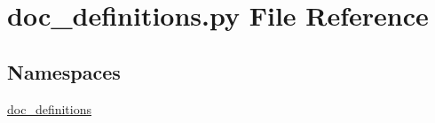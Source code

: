 \section{doc\-\_\-definitions.\-py File Reference}
\label{doc__definitions_8py}
\subsection*{Namespaces}
\begin{DoxyCompactItemize}
\item 
\hyperlink{namespacedoc__definitions}{doc\-\_\-definitions}
\end{DoxyCompactItemize}
